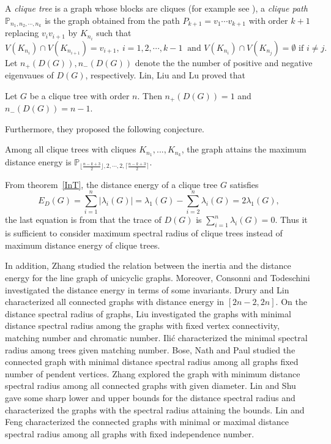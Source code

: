 \documentclass[10pt]{article}
\begin{document}
A {\it clique tree} is a graph whose blocks are cliques (for example see \cite{blair1993}), a {\it clique path} $\mathbb{P}_{n_1,n_2,\cdots,n_k}$ is the graph obtained from the path $P_{k+1}=v_1\cdots v_{k+1}$ with order $k+1$ replacing $v_iv_{i+1}$  by $K_{n_i}$ such that
$$V(K_{n_i})\cap V(K_{n_{i+1}})=v_{i+1},~i=1,2,\cdots,k-1~\mbox{ and } V(K_{n_i})\cap V(K_{n_{j}})=\emptyset\mbox{ if }i\neq j.$$  Let $n_+(D(G)),n_-(D(G))$ denote the the number of positive and negative eigenvaues of $D(G)$, respectively. Lin, Liu and Lu \cite{Linl2015} proved  that
 \begin{theorem}\label{InT}\cite{Linl2015}
 Let $G$ be a clique tree with order $n$. Then $n_+(D(G))=1$ and $n_-(D(G))=n-1$.
 \end{theorem}
Furthermore, they proposed the following conjecture.
\begin{conjecture}\cite{Linl2015}\label{con}
Among all clique trees with cliques $K_{n_1} , ..., K_{n_k}$, the graph attains the
maximum distance energy is $\mathbb{P}_{\lfloor \frac{n-k+3}{2}\rfloor,2,\cdots,2,\lceil \frac{n-k+3}{2}\rceil}$.
\end{conjecture}
From theorem~\ref{InT}, the distance energy of a clique tree $G$ satisfies
 \begin{equation}\label{Eq1}E_D(G)=\sum_{i=1}^n|\lambda_i(G)|=\lambda_1(G)-\sum_{i=2}^n\lambda_i(G)=2\lambda_1(G),\end{equation}
 the last equation is from that the trace of $D(G)$ is $\sum_{i=1}^n\lambda_i(G)=0$. Thus it is sufficient to consider maximum spectral radius of clique trees  instead of maximum distance energy of clique trees.

   In addition,    Zhang \cite{zhang2019} studied the relation between the inertia  and the distance energy  for the line graph of unicyclic graphs.
               Moreover,  Consonni and Todeschini \cite{Consonni2008} investigated the distance energy in terms of some invariants. Drury and Lin \cite{Drury2015} characterized all connected graphs with distance energy in $[2n-2,2n]$.
   On the distance spectral radius of graphs, Liu \cite{Liu} investigated the graphs with minimal distance spectral radius among the graphs with fixed vertex connectivity, matching number and chromatic number. Ili\'{c} \cite{Ilic} characterized the minimal spectral radius among trees given matching number. Bose, Nath and Paul \cite{Bose} studied the connected graph with minimal distance spectral radius among all graphs fixed number of pendent vertices. Zhang \cite{Zhang} explored the graph with minimum distance spectral radius among all connected graphs with given diameter. Lin and Shu \cite{LinS2013} gave some sharp lower and upper bounds for the distance spectral radius and characterized the graphs with the spectral radius attaining the bounds. Lin and Feng \cite{Lin2015} characterized the connected graphs with minimal or maximal distance spectral radius among all graphs with fixed independence number.
\end{document}
